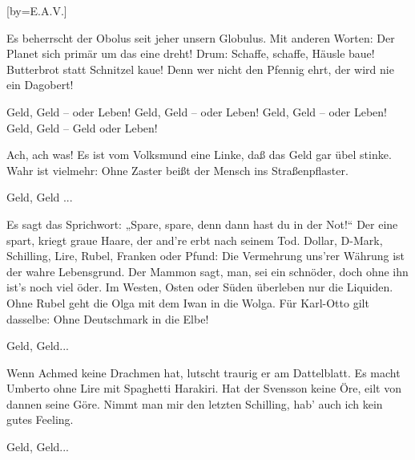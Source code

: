 [by={E.A.V.}]

\beginverse
Es beherrscht der Obolus seit jeher unsern Globulus.
Mit anderen Worten: Der Planet sich primär um das eine dreht!
Drum: Schaffe, schaffe, Häusle baue! Butterbrot statt Schnitzel kaue! 
Denn wer nicht den Pfennig ehrt, der wird nie ein Dagobert!
\endverse

\beginchorus
Geld, Geld -- oder Leben!
Geld, Geld -- oder Leben!
Geld, Geld -- oder Leben!
Geld, Geld -- Geld oder Leben!
\endchorus

\beginverse
Ach, ach was!
Es ist vom Volksmund eine Linke,
daß das Geld gar übel stinke.
Wahr ist vielmehr: Ohne Zaster
beißt der Mensch ins Straßenpflaster.

Geld, Geld ...
\endverse

\beginverse
Es sagt das Sprichwort: „Spare, spare,
denn dann hast du in der Not!“
Der eine spart, kriegt graue Haare,
der and're erbt nach seinem Tod.
\endverse
\beginverse
Dollar, D-Mark, Schilling, Lire,
Rubel, Franken oder Pfund:
Die Vermehrung uns'rer Währung
ist der wahre Lebensgrund.
\endverse
\beginverse
Der Mammon sagt, man, sei ein schnöder,
doch ohne ihn ist's noch viel öder.
Im Westen, Osten oder Süden
überleben nur die Liquiden.
\endverse
\beginverse
Ohne Rubel geht die Olga
mit dem Iwan in die Wolga.
Für Karl-Otto gilt dasselbe:
Ohne Deutschmark in die Elbe!

Geld, Geld...
\endverse

\beginverse
Wenn Achmed keine Drachmen hat,
lutscht traurig er am Dattelblatt.
Es macht Umberto ohne Lire
mit Spaghetti Harakiri.
\endverse
\beginverse
Hat der Svensson keine Öre,
eilt von dannen seine Göre.
Nimmt man mir den letzten Schilling,
hab' auch ich kein gutes Feeling.
\endverse

\beginchorus
Geld, Geld...
\endchorus


\endsong
